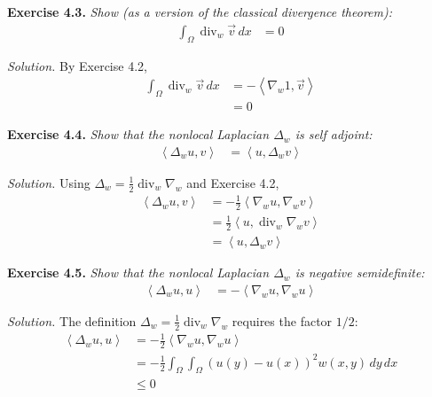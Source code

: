 \documentclass[12pt,letterpaper]{article}
\newcommand{\diver}{\operatorname{div}}
\newcommand{\ip}[2]{\left\langle #1,#2\right\rangle}
\newcommand{\exercise}[1]{%
  \par\bigskip\noindent\textbf{Exercise #1.}\enspace}
\newenvironment{statement}{\itshape\ignorespaces}{\par}
\newcommand{\solution}{\par\medskip\noindent\textit{Solution.}\enspace}
\begin{document}
\clearpage
\begin{samepage}
\exercise{4.3}
\begin{statement}
Show (as a version of the classical divergence theorem):
\begin{align*}
 \int_\Omega\diver_w\vec v\,dx&=0
\end{align*}
\end{statement}
\solution
By Exercise 4.2,
\begin{align*}
 \int_\Omega\diver_w\vec v\,dx
 &=-\ip{\nabla_w1}{\vec v}\\
 &=0
 \tag*{$\square$}
\end{align*}
\end{samepage}

\begin{samepage}
\exercise{4.4}
\begin{statement}
Show that the nonlocal Laplacian $\Delta_w$ is self adjoint:
\begin{align*}
 \ip{\Delta_wu}{v}&=\ip{u}{\Delta_wv}
\end{align*}
\end{statement}
\solution
Using $\Delta_w=\tfrac12\diver_w\nabla_w$ and Exercise 4.2,
\begin{align*}
 \ip{\Delta_wu}{v}
 &=-\frac12\ip{\nabla_wu}{\nabla_wv}\\
 &=\frac12\ip{u}{\diver_w\nabla_wv}\\
 &=\ip{u}{\Delta_wv}
 \tag*{$\square$}
\end{align*}
\end{samepage}

\begin{samepage}
\exercise{4.5}
\begin{statement}
Show that the nonlocal Laplacian $\Delta_w$ is negative semidefinite:
\begin{align*}
 \ip{\Delta_wu}{u}&=-\ip{\nabla_wu}{\nabla_wu}
\end{align*}
\end{statement}
\solution
The definition $\Delta_w=\tfrac12\diver_w\nabla_w$ requires the factor $1/2$:
\begin{align*}
 \ip{\Delta_wu}{u}
 &=-\frac12\ip{\nabla_wu}{\nabla_wu}\\
 &=-\frac12\int_\Omega\int_\Omega
   (u(y)-u(x))^2w(x,y)\,dy\,dx\\
 &\leq0
 \tag*{$\square$}
\end{align*}
\end{samepage}
\end{document}
